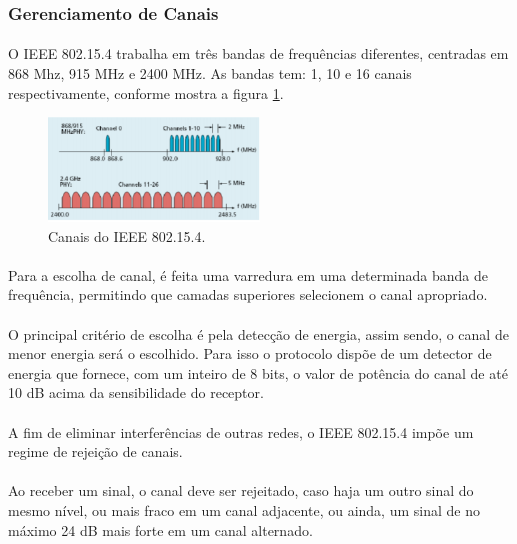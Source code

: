 \subsubsection{Gerenciamento de Canais}
\paragraph{} O IEEE 802.15.4 trabalha em três bandas de frequências diferentes, centradas em 868 Mhz, 915 MHz e 2400 MHz. As bandas tem: 1, 10 e 16 canais respectivamente, conforme mostra a figura \ref{fig:figura3}.

\begin{figure}[!ht]
	\centering
	\includegraphics[width=0.5\textwidth]{Figuras/canais.PNG}   
	\caption{Canais do IEEE 802.15.4. \citep{Ufes}}
	\label{fig:figura3}
\end{figure}

\paragraph{} Para a escolha de canal, é feita uma varredura em uma determinada banda de frequência, permitindo que camadas superiores selecionem o canal apropriado. 

\paragraph{} O principal critério de escolha é pela detecção de energia, assim sendo, o canal de menor energia será o escolhido. Para isso o protocolo dispõe de um detector de energia que fornece, com um inteiro de 8 bits, o valor de potência do canal de até 10 dB acima da sensibilidade do receptor.

\paragraph{} A fim de eliminar interferências de outras redes, o IEEE 802.15.4 impõe um regime de rejeição de canais.

\paragraph{} Ao receber um sinal, o canal deve ser rejeitado,  caso haja um outro sinal do mesmo nível, ou mais fraco em um canal adjacente, ou ainda, um sinal de no máximo 24 dB mais forte em um canal alternado.

